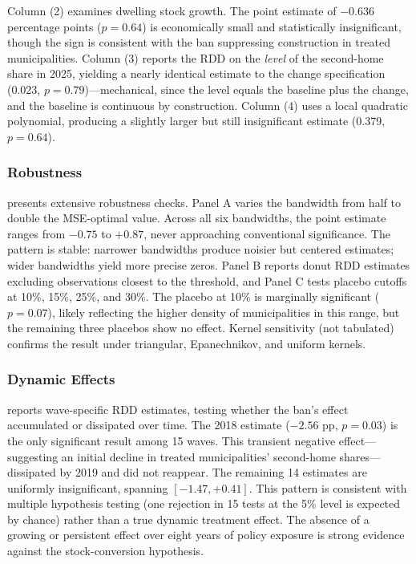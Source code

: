 \documentclass[12pt]{article}
\begin{document}
Column (2) examines dwelling stock growth. The point estimate of $-0.636$ percentage points ($p = 0.64$) is economically small and statistically insignificant, though the sign is consistent with the ban suppressing construction in treated municipalities. Column (3) reports the RDD on the \textit{level} of the second-home share in 2025, yielding a nearly identical estimate to the change specification (0.023, $p = 0.79$)---mechanical, since the level equals the baseline plus the change, and the baseline is continuous by construction. Column (4) uses a local quadratic polynomial, producing a slightly larger but still insignificant estimate (0.379, $p = 0.64$).



\subsubsection*{Robustness}  presents extensive robustness checks. Panel A varies the bandwidth from half to double the MSE-optimal value. Across all six bandwidths, the point estimate ranges from $-0.75$ to $+0.87$, never approaching conventional significance. The pattern is stable: narrower bandwidths produce noisier but centered estimates; wider bandwidths yield more precise zeros. Panel B reports donut RDD estimates excluding observations closest to the threshold, and Panel C tests placebo cutoffs at 10\%, 15\%, 25\%, and 30\%. The placebo at 10\% is marginally significant ($p = 0.07$), likely reflecting the higher density of municipalities in this range, but the remaining three placebos show no effect. Kernel sensitivity (not tabulated) confirms the result under triangular, Epanechnikov, and uniform kernels.



\subsubsection*{Dynamic Effects}  reports wave-specific RDD estimates, testing whether the ban's effect accumulated or dissipated over time. The 2018 estimate ($-2.56$ pp, $p = 0.03$) is the only significant result among 15 waves. This transient negative effect---suggesting an initial decline in treated municipalities' second-home shares---dissipated by 2019 and did not reappear. The remaining 14 estimates are uniformly insignificant, spanning $[-1.47, +0.41]$. This pattern is consistent with multiple hypothesis testing (one rejection in 15 tests at the 5\% level is expected by chance) rather than a true dynamic treatment effect. The absence of a growing or persistent effect over eight years of policy exposure is strong evidence against the stock-conversion hypothesis.
\end{document}
